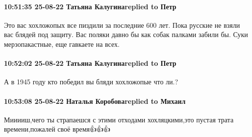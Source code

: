 \paragraph{10:51:35 25-08-22 Татьяна Калугинаreplied to Петр}

Это вас хохложопых все пиздили за последние 600 лет. Пока русские не взяли вас
блядей под защиту. Вас поляки давно бы как собак палками забили бы. Суки
мерзопакастные, еще гавкаете на всех.

\paragraph{10:52:02 25-08-22 Татьяна Калугинаreplied to Петр}

А в 1945 году кто победил вы бляди хохложопые что ли.?

\paragraph{10:53:08 25-08-22 Наталья Коробоваreplied to Михаил}

Мииииш,чего ты страпаешся с этими отходами хохляцкими,это пустая трата
времени,пожалей своё время👍👍👍
